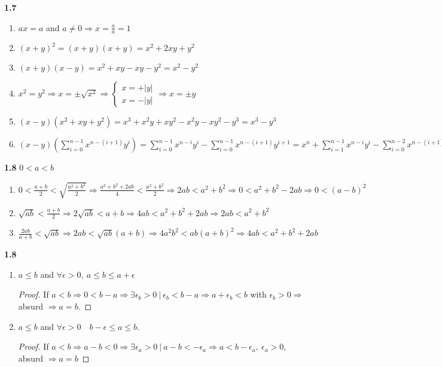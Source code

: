 \documentclass[12pt, a4paper]{book}
\begin{document}
\textbf{1.7}
\begin{enumerate}[label=\emph{\alph*})]
  \item $ax=a$ and $a\neq 0 \Rightarrow x = \frac{a}{a} = 1$
  \item ${(x+y)}^2 = (x+y)(x+y) = x^2 + 2xy + y^2$
  \item $(x+y)(x-y) = x^2 + xy - xy - y^2 = x^2 - y^2$
  \item $x^2 = y^2 \Rightarrow x = \pm \sqrt{x^2} \Rightarrow \begin{cases}
    x = +|y| \\
    x = -|y|
  \end{cases} \Rightarrow x = \pm y$
  \item $(x-y)(x^2 + xy + y^2) = x^3 + x^2y + x y^2 - x^2y - x y^2 - y^3 = x^3 - y^3$
  \item $\displaystyle (x-y) (\sum_{i = 0}^{n-1} x^{n-(i+1)}y^i) = \sum_{i = 0}^{n-1} x^{n-i}y^i - \sum_{i = 0}^{n-1} x^{n-(i+1)}y^{i+1} = x^n + \sum_{i = 1}^{n-1} x^{n-i} y^i - \sum_{i = 0}^{n-2} x^{n-(i+1)}y^{i+1} - y^n = x^n + \sum_{i = 1}^{n-1} x^{n-i} y^i - \sum_{i = 1}^{n-1} x^{n-i}y^{i} - y^n  = x^n - y^n$
\end{enumerate}

\textbf{1.8} $0<a<b$
\begin{enumerate}[label=\emph{\alph*})]
  \item $\displaystyle 0 < \frac{a+b}{2} < \sqrt{\frac{a^2+b^2}{2}} \Rightarrow \frac{a^2+b^2+2ab}{4} < \frac{a^2+b^2}{2} \Rightarrow 2ab < a^2+b^2 \Rightarrow 0 < a^2 + b^2 - 2ab \Rightarrow 0 < {(a-b)}^2$
  \item $\sqrt{ab} < \frac{a+b}{2} \Rightarrow 2\sqrt{ab} < a + b \Rightarrow 4ab < a^2 + b^2 + 2ab \Rightarrow 2ab < a^2+b^2$
  \item $\frac{2ab}{a+b} < \sqrt{ab} \Rightarrow 2ab < \sqrt{ab}(a+b) \Rightarrow 4a^2b^2 < ab {(a+b)}^2 \Rightarrow 4ab < a^2 + b^2 + 2ab$
\end{enumerate}

\textbf{1.8}
\begin{enumerate}[label=\emph{\alph*})]
  \item $a \leq b$ and $\forall \epsilon >0,\ a\leq b \leq a+\epsilon$

  \begin{proof}
    If $a<b \Rightarrow 0<b-a \Rightarrow \exists \epsilon_b >0\ |\ \epsilon_b < b-a \Rightarrow a + \epsilon_b < b$ with $\epsilon_b > 0 \Rightarrow$ absurd $\Rightarrow a=b$.
  \end{proof}
  
  \item $a\leq b$ and $\forall \epsilon > 0\quad b-\epsilon \leq a \leq b$.

  \begin{proof}
    If $a<b \Rightarrow a-b < 0 \Rightarrow \exists \epsilon_a > 0\ |\ a-b < -\epsilon_a \Rightarrow a<b-\epsilon_a,\ \epsilon_a > 0$, absurd $\Rightarrow a=b$
  \end{proof}
\end{enumerate}
\end{document}
